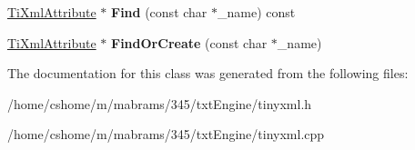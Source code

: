 \begin{DoxyCompactItemize}
\item 
\hypertarget{class_ti_xml_attribute_set_af3675cc2bfd0aea153cda1cfcdd1f77e}{
\hyperlink{class_ti_xml_attribute}{\-Ti\-Xml\-Attribute} $\ast$ {\bfseries \-Find} (const char $\ast$\-\_\-name) const }
\label{class_ti_xml_attribute_set_af3675cc2bfd0aea153cda1cfcdd1f77e}

\item 
\hypertarget{class_ti_xml_attribute_set_a5e28f5d32f048fba85d04dc317495bdc}{
\hyperlink{class_ti_xml_attribute}{\-Ti\-Xml\-Attribute} $\ast$ {\bfseries \-Find\-Or\-Create} (const char $\ast$\-\_\-name)}
\label{class_ti_xml_attribute_set_a5e28f5d32f048fba85d04dc317495bdc}

\end{DoxyCompactItemize}


\-The documentation for this class was generated from the following files\-:\begin{DoxyCompactItemize}
\item 
/home/cshome/m/mabrams/345/txt\-Engine/tinyxml.\-h\item 
/home/cshome/m/mabrams/345/txt\-Engine/tinyxml.\-cpp\end{DoxyCompactItemize}
